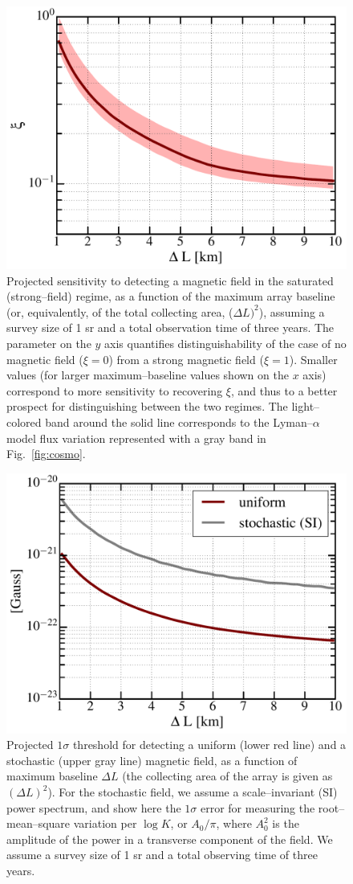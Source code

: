 \begin{figure}
\centering
\includegraphics[width=.4\textwidth,keepaspectratio=true]{xi_vs_deltas.pdf}
\caption{Projected sensitivity to detecting a magnetic field in the saturated (strong--field) regime, as a function of the maximum array baseline (or, equivalently, of the total collecting area, ($\Delta L)^2$), assuming a survey size of 1 sr and a total observation time of three years. The parameter on the $y$ axis quantifies distinguishability of the case of no magnetic field ($\xi=0$) from a strong magnetic field ($\xi=1$). Smaller values (for larger maximum--baseline values shown on the $x$ axis) correspond to more sensitivity to recovering $\xi$, and thus to a better prospect for distinguishing between the two regimes. The light--colored band around the solid line corresponds to the Lyman--$\alpha$ model flux variation represented with a gray band in Fig.~\ref{fig:cosmo}.\label{fig:xi_vs_deltas}}
\end{figure}
\begin{figure}
\centering
\includegraphics[width=.4\textwidth,keepaspectratio=true]{B_vs_deltas.pdf}
\caption{Projected $1\sigma$ threshold for detecting a uniform (lower red line) and a stochastic (upper gray line) magnetic field, as a function of maximum baseline $\Delta L$ (the collecting area of the array is given as $(\Delta L)^2$).  For the stochastic field, we assume a scale--invariant (SI) power spectrum, and show here the $1\sigma$ error for measuring the root--mean--square variation per $\log K$, or $A_0/\pi$, where $A_0^2$ is the amplitude of the power in a transverse component of the field. We assume a survey size of 1 sr and a total observing time of three years.\label{fig:B_vs_deltas}}
\end{figure}

